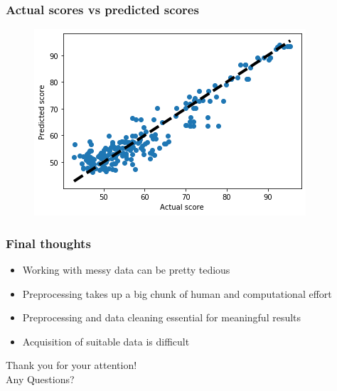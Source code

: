 \documentclass[mathserif,notheorems,11pt]{beamer}
\begin{document}
\begin{frame}
\frametitle{Actual scores vs predicted scores}
\begin{figure}
\centering
\includegraphics[width=1\linewidth]{graphs/pred_uniFeatures_unirank}
\end{figure}

\end{frame}

\begin{frame} 
\frametitle{Final thoughts}
\begin{itemize}

\item Working with messy data can be pretty tedious

\item Preprocessing takes up a big chunk of human and computational effort

\item Preprocessing and data cleaning essential for meaningful results

\item Acquisition of suitable data is difficult



\end{itemize}


\end{frame}

\begin{frame}

\centering\Huge {Thank you for your attention!}\\
\centering\Large{Any Questions?}


\end{frame}
\end{document}
